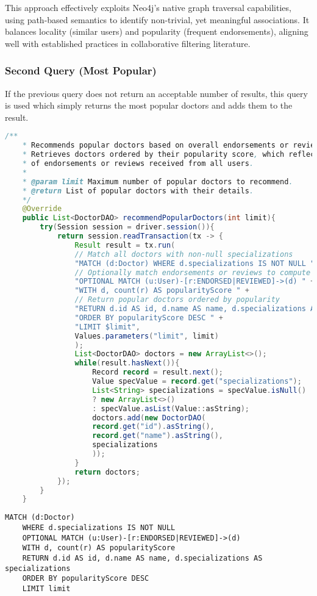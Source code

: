 This approach effectively exploits Neo4j's native graph traversal capabilities, using path-based semantics to identify non-trivial, yet meaningful associations. It balances locality (similar users) and popularity (frequent endorsements), aligning well with established practices in collaborative filtering literature.

\subsubsection{Second Query (Most Popular)}
If the previous query does not return an acceptable number of results, this query is used which simply returns the most popular doctors and adds them to the result.

\begin{lstlisting}[language=java, caption={Java code for the Recommendations with the most popular doctors}]
	/**
	* Recommends popular doctors based on overall endorsements or reviews.
	* Retrieves doctors ordered by their popularity score, which reflects the total number
	* of endorsements or reviews received from all users.
	*
	* @param limit Maximum number of popular doctors to recommend.
	* @return List of popular doctors with their details.
	*/
	@Override
	public List<DoctorDAO> recommendPopularDoctors(int limit){
		try(Session session = driver.session()){
			return session.readTransaction(tx -> {
				Result result = tx.run(
				// Match all doctors with non-null specializations
				"MATCH (d:Doctor) WHERE d.specializations IS NOT NULL " +
				// Optionally match endorsements or reviews to compute popularity
				"OPTIONAL MATCH (u:User)-[r:ENDORSED|REVIEWED]->(d) " +
				"WITH d, count(r) AS popularityScore " +
				// Return popular doctors ordered by popularity
				"RETURN d.id AS id, d.name AS name, d.specializations AS specializations " +
				"ORDER BY popularityScore DESC " +
				"LIMIT $limit",
				Values.parameters("limit", limit)
				);
				List<DoctorDAO> doctors = new ArrayList<>();
				while(result.hasNext()){
					Record record = result.next();
					Value specValue = record.get("specializations");
					List<String> specializations = specValue.isNull()
					? new ArrayList<>()
					: specValue.asList(Value::asString);
					doctors.add(new DoctorDAO(
					record.get("id").asString(),
					record.get("name").asString(),
					specializations
					));
				}
				return doctors;
			});
		}
	}
\end{lstlisting}

\begin{lstlisting}[language=cypher, caption={Equivalent Cypher query for Recommendations with the most popular doctors}]
	MATCH (d:Doctor)
	WHERE d.specializations IS NOT NULL
	OPTIONAL MATCH (u:User)-[r:ENDORSED|REVIEWED]->(d)
	WITH d, count(r) AS popularityScore
	RETURN d.id AS id, d.name AS name, d.specializations AS specializations
	ORDER BY popularityScore DESC
	LIMIT limit
\end{lstlisting}

